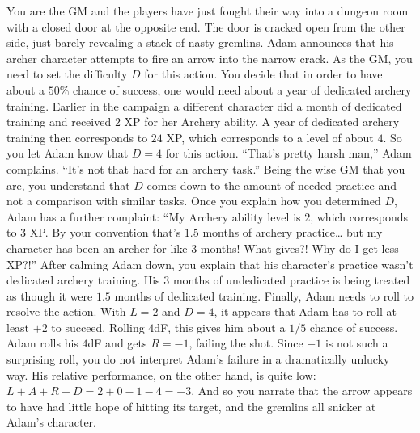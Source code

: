 \begin{example}
You are the GM and the players have just fought their way into a dungeon room with a closed door at the opposite end.
The door is cracked open from the other side, just barely revealing a stack of nasty gremlins.
Adam announces that his archer character attempts to fire an arrow into the narrow crack.
As the GM, you need to set the difficulty $D$ for this action.
You decide that in order to have about a $50\%$ chance of success, one would need about a year of dedicated archery training.
Earlier in the campaign a different character did a month of dedicated training and received $2$ XP for her Archery ability.
A year of dedicated archery training then corresponds to $24$ XP, which corresponds to a level of about $4$.
So you let Adam know that $D=4$ for this action.
``That’s pretty harsh man,'' Adam complains.
``It’s not that hard for an archery task.''
Being the wise GM that you are, you understand that $D$ comes down to the amount of needed practice and not a comparison with similar tasks.
Once you explain how you determined $D$, Adam has a further complaint:
``My Archery ability level is $2$, which corresponds to $3$ XP.
By your convention that’s $1.5$ months of archery practice… but my character has been an archer for like $3$ months!
What gives?!
Why do I get less XP?!'' After calming Adam down, you explain that his character’s practice wasn’t dedicated archery training.
His $3$ months of undedicated practice is being treated as though it were $1.5$ months of dedicated training.
Finally, Adam needs to roll to resolve the action.
With $L=2$ and $D=4$, it appears that Adam has to roll at least $+2$ to succeed.
Rolling $4$dF, this gives him about a $1/5$ chance of success.
Adam rolls his $4$dF and gets $R=-1$, failing the shot.
Since $-1$ is not such a surprising roll, you do not interpret Adam’s failure in a dramatically unlucky way.
His relative performance, on the other hand, is quite low: $L+A+R-D = 2+0-1-4 = -3$.
And so you narrate that the arrow appears to have had little hope of hitting its target,
and the gremlins all snicker at Adam’s character.
\end{example}


